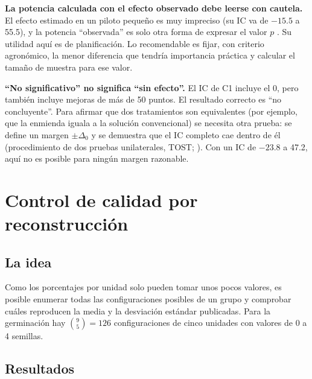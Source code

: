 \documentclass[11pt]{article}
\begin{document}
\textbf{La potencia calculada con el efecto observado debe leerse con cautela.} El efecto estimado en un piloto pequeño es muy impreciso (su IC va de $-15.5$ a 55.5), y la potencia ``observada'' es solo otra forma de expresar el valor $p$ \citep{hoenig}. Su utilidad aquí es de planificación. Lo recomendable es fijar, con criterio agronómico, la menor diferencia que tendría importancia práctica y calcular el tamaño de muestra para ese valor.

\textbf{``No significativo'' no significa ``sin efecto''.} El IC de C1 incluye el 0, pero también incluye mejoras de más de 50 puntos. El resultado correcto es ``no concluyente''. Para afirmar que dos tratamientos son equivalentes (por ejemplo, que la enmienda iguala a la solución convencional) se necesita otra prueba: se define un margen $\pm\Delta_0$ y se demuestra que el IC completo cae dentro de él (procedimiento de dos pruebas unilaterales, TOST; \citealp{schuirmann}). Con un IC de $-23.8$ a 47.2, aquí no es posible para ningún margen razonable.

\section{Control de calidad por reconstrucción}

\subsection{La idea}

Como los porcentajes por unidad solo pueden tomar unos pocos valores, es posible enumerar todas las configuraciones posibles de un grupo y comprobar cuáles reproducen la media y la desviación estándar publicadas. Para la germinación hay $\binom{9}{5} = 126$ configuraciones de cinco unidades con valores de 0 a 4 semillas.

\subsection{Resultados}
\end{document}
